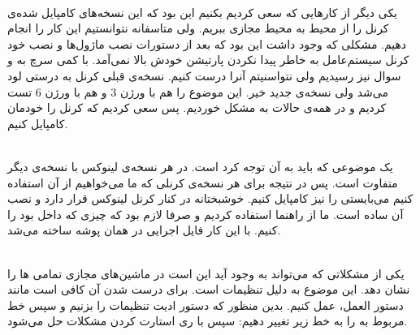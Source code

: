 \\\noindent
یکی دیگر از کار‌هایی که سعی کردیم بکنیم این بود که این نسخه‌های کامپایل شده‌ی کرنل را از محیط
به محیط مجازی ببریم. ولی متاسفانه نتوانستیم این کار را انجام دهیم. مشکلی که وجود داشت این بود که بعد از
دستورات نصب ماژول‌ها و نصب خود کرنل سیستم‌عامل به خاطر پیدا نکردن پارتیشن خودش بالا نمی‌آمد. با کمی سرچ به
و
سوال نیز رسیدیم ولی نتواسنیتم آنرا درست کنیم. نسخه‌ی قبلی کرنل به درستی لود می‌شد ولی نسخه‌ی جدید خیر.
این موضوع را هم با ورژن 3 و هم با ورژن 6 تست کردیم و در همه‌ی حالات به مشکل خوردیم. پس سعی کردیم که کرنل
را خودمان کامپایل کنیم.

\\\noindent
یک موضوعی که باید به آن توجه کرد
است.
در هر نسخه‌ی لینوکس با نسخه‌ی دیگر متفاوت است. پس در نتیجه برای هر نسخه‌ی کرنلی که ما می‌خواهیم از آن استفاده
کنیم می‌بایستی
را نیز کامپایل کنیم. خوشبختانه
در کنار کرنل لینوکس قرار دارد و نصب آن ساده است. ما از
راهنما استفاده کردیم و صرفا لازم بود که چیزی که داخل
بود را
کنیم. با این کار فایل اجرایی
در همان پوشه ساخته می‌شد.

\\\noindent
یکی از مشکلاتی که می‌تواند به وجود آید این است در ماشین‌های مجازی
تمامی
ها را
نشان دهد. این موضوع به دلیل تنظیمات
است. برای درست شدن آن کافی است مانند 
دستور العمل،‌ عمل کنیم. بدین منظور که دستور ادیت تنظیمات
را بزنیم و سپس خط مربوط به
را به خط زیر تغییر دهیم:
سپس با ری استارت کردن
مشکلات حل می‌شود.


